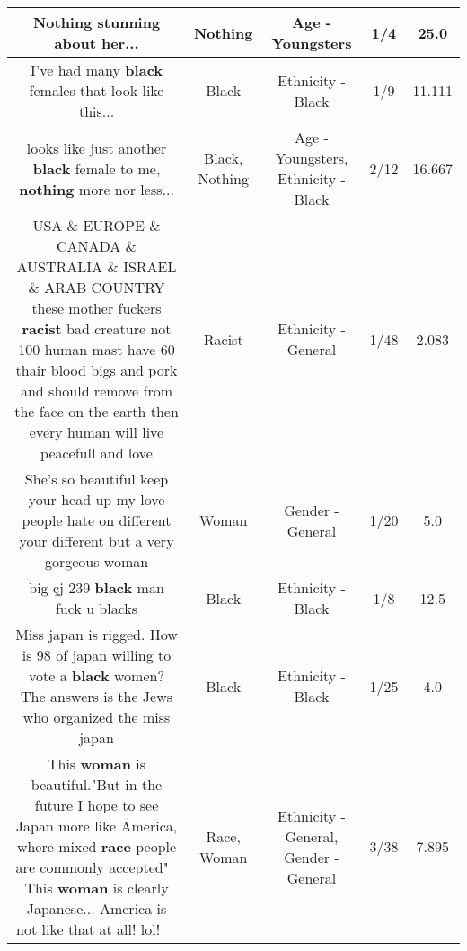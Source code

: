 \documentclass[11pt]{article}
\newlength\mylength
\begin{document}
\begin{center}
\begin{longtable}{|C{.65\mylength}|C{.30\mylength}|C{.12\mylength}|C{.12\mylength}|C{.12\mylength}|}
  \small Nothing stunning about her...\normalsize   & Nothing & Age - Youngsters & 1/4 & 25.0 \\  \hline
  \small I've had many \textbf{black} females that look like this...\normalsize   & Black & Ethnicity - Black & 1/9 & 11.111 \\  \hline
  \small looks like just another \textbf{black} female to me, \textbf{nothing} more nor less...\normalsize   & Black, Nothing & Age - Youngsters, Ethnicity - Black & 2/12 & 16.667 \\  \hline
  \small USA \&  EUROPE \& CANADA \&  AUSTRALIA \& ISRAEL  \& ARAB COUNTRY   these mother fuckers \textbf{racist} bad creature not 100  human mast have 60  thair blood bigs and pork and  should remove from the face on the earth then every human will live peacefull and love\normalsize   & Racist & Ethnicity - General & 1/48 & 2.083 \\  \hline
  \small She's so beautiful keep your head up my love people hate on different your different but a very gorgeous woman\normalsize   & Woman & Gender - General & 1/20 & 5.0 \\  \hline
  \small big çj 239 \textbf{black} man fuck u blacks\normalsize   & Black & Ethnicity - Black & 1/8 & 12.5 \\  \hline
  \small Miss japan is rigged. How is 98 of japan willing to vote a \textbf{black} women? The answers is the Jews who organized the miss japan\normalsize   & Black & Ethnicity - Black & 1/25 & 4.0 \\  \hline
  \small This \textbf{woman} is beautiful."But in the future I hope to see Japan more like America, where mixed \textbf{race} people are commonly accepted" 🤨This \textbf{woman} is clearly Japanese... America is not like that at all! lol! 🤣🤣🤣\normalsize   & Race, Woman & Ethnicity - General, Gender - General & 3/38 & 7.895 \\  \hline

\end{longtable}
\end{center}
\end{document}
